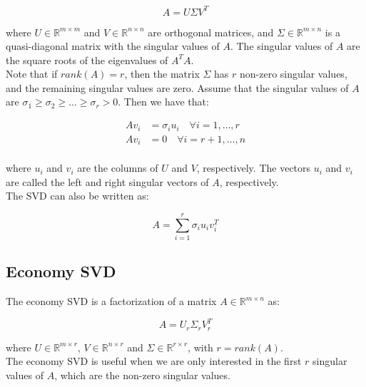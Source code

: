\begin{equation}
    A = U \Sigma V^T
\end{equation}

where $U \in \mathbb{R}^{m \times m}$ and $V \in \mathbb{R}^{n \times n}$ are orthogonal matrices, and $\Sigma \in \mathbb{R}^{m \times n}$
is a quasi-diagonal matrix with the singular values of $A$. The singular values of $A$ are the square roots of the eigenvalues of $A^T A$.\\

Note that if $rank(A) = r$, then the matrix $\Sigma$ has $r$ non-zero singular values, and the remaining singular values are zero. Assume that
the singular values of $A$ are $\sigma_1 \geq \sigma_2 \geq \ldots \geq \sigma_r > 0$. Then we have that:

\begin{equation}
    \begin{aligned}
        A v_i &= \sigma_i u_i \quad \forall i = 1, \ldots, r \\
        A v_i &= 0 \quad \forall i = r+1, \ldots, n \\
    \end{aligned}
\end{equation}

where $u_i$ and $v_i$ are the columns of $U$ and $V$, respectively. The vectors $u_i$ and $v_i$ are called the left and right singular vectors
of $A$, respectively.\\

The SVD can also be written as:

\begin{equation}
    A = \sum_{i=1}^{r} \sigma_i u_i v_i^T
\end{equation}

\subsection{Economy SVD}

The economy SVD is a factorization of a matrix $A \in \mathbb{R}^{m \times n}$ as:

\begin{equation}
    A = U_r \Sigma_r V_r^T
\end{equation}

where $U \in \mathbb{R}^{m \times r}$, $V \in \mathbb{R}^{n \times r}$ and $\Sigma \in \mathbb{R}^{r \times r}$, with $r = rank(A)$.\\

The economy SVD is useful when we are only interested in the first $r$ singular values of $A$, which are the non-zero singular values.\\

